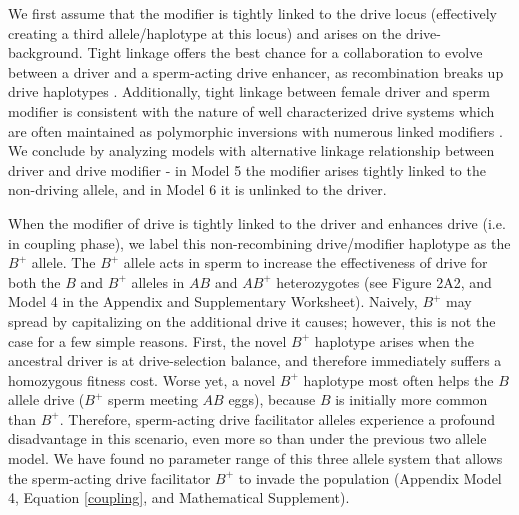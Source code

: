 \documentclass{pnastwo}
\begin{document}
\begin{article}
We first assume that the modifier is tightly
        linked to the drive locus (effectively creating a third
        allele/haplotype at this locus) and arises on the drive-background. 
Tight linkage offers the best
        chance for a collaboration to evolve between a driver and
       a sperm-acting drive  enhancer, as recombination breaks up drive haplotypes \cite{Thomson1974,Charlesworth1978,Haig1991}. 
Additionally, tight linkage between female driver and sperm modifier is consistent with the nature of well characterized drive systems which are often maintained as polymorphic inversions with numerous linked modifiers \cite{Burt2006}. 
We conclude by analyzing models with alternative linkage relationship between driver and drive modifier - 
	in Model 5 the modifier arises tightly linked to the non-driving allele, 
	and in Model 6 it is unlinked to the driver. 


When the modifier of drive is tightly linked to the driver and
enhances drive (i.e. in coupling phase), 
	we label  this non-recombining drive/modifier haplotype as the $B^+$ allele.  
The $B^+$ allele acts in sperm to increase the effectiveness of drive for both
	the $B$ and  $B^{+}$ alleles in $AB$ and $AB^{+}$ heterozygotes (see Figure 2A2, and Model 4 in the Appendix and Supplementary Worksheet). 
Naively, $B^{+}$ may spread by capitalizing on the additional drive it causes; however,  
	this is not the case for a few simple reasons. 
First, the novel $B^{+}$ haplotype
	arises when the ancestral driver 
	is at drive-selection balance, 
	and therefore immediately suffers a homozygous fitness cost.  
Worse yet, a novel $B^{+}$ haplotype most often helps 
	the $B$  allele drive ($B^+$ sperm meeting $AB$ eggs), because $B$ is initially more common than $B^{+}$. 
Therefore, sperm-acting drive facilitator alleles experience a profound disadvantage 
	in this scenario, even more so than under the previous two allele model. 
We have found no parameter range of this
	three allele system that allows the sperm-acting drive facilitator $B^{+}$ to
	invade the population (Appendix Model 4, Equation \eqref{coupling}, and Mathematical Supplement). 


\end{article}
\end{document}
